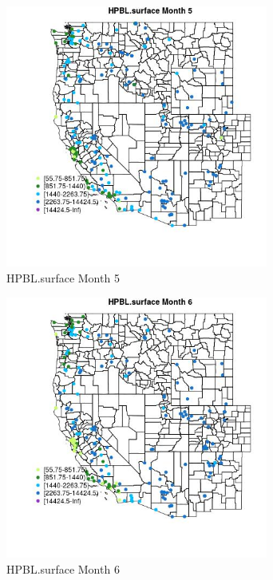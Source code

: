 \begin{figure} 
\centering  
\includegraphics[width=0.77\textwidth]{Code_Outputs/Report_ML_input_PM25_Step4_part_e_de_duplicated_aveswNAs_MapObsMo5HPBLsurface.jpg} 
\caption{\label{fig:Report_ML_input_PM25_Step4_part_e_de_duplicated_aveswNAsMapObsMo5HPBLsurface}HPBL.surface Month 5} 
\end{figure} 
 

\begin{figure} 
\centering  
\includegraphics[width=0.77\textwidth]{Code_Outputs/Report_ML_input_PM25_Step4_part_e_de_duplicated_aveswNAs_MapObsMo6HPBLsurface.jpg} 
\caption{\label{fig:Report_ML_input_PM25_Step4_part_e_de_duplicated_aveswNAsMapObsMo6HPBLsurface}HPBL.surface Month 6} 
\end{figure} 
 

